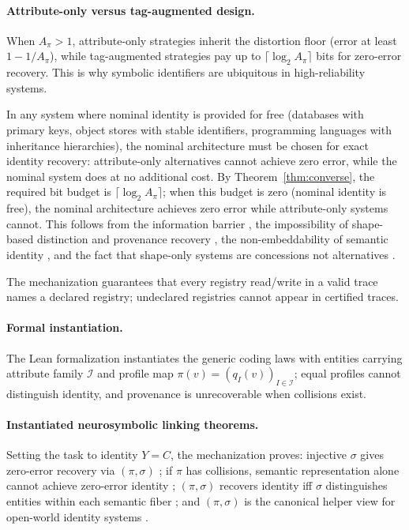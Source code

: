 \paragraph{Attribute-only versus tag-augmented design.}
When $A_\pi>1$, attribute-only strategies inherit the distortion floor (error at least $1-1/A_\pi$), while tag-augmented strategies pay up to $\lceil \log_2 A_\pi \rceil$ bits for zero-error recovery. This is why symbolic identifiers are ubiquitous in high-reliability systems.

\begin{corollary}\label{cor:pareto-domination}
In any system where nominal identity is provided for free (databases with primary keys, object stores with stable identifiers, programming languages with inheritance hierarchies), the nominal architecture must be chosen for exact identity recovery: attribute-only alternatives cannot achieve zero error, while the nominal system does at no additional cost. By Theorem~\ref*{thm:converse}, the required bit budget is $\lceil \log_2 A_\pi \rceil$; when this budget is zero (nominal identity is free), the nominal architecture achieves zero error while attribute-only systems cannot. This follows from the information barrier , the impossibility of shape-based distinction  and provenance recovery , the non-embeddability of semantic identity , and the fact that shape-only systems are concessions not alternatives .
\end{corollary}


The mechanization guarantees that every registry read/write in a valid trace names a declared registry; undeclared registries cannot appear in certified traces. 

\paragraph{Formal instantiation.}
The Lean formalization instantiates the generic coding laws with entities carrying attribute family $\mathcal I$ and profile map $\pi(v)=(q_I(v))_{I\in\mathcal I}$; equal profiles cannot distinguish identity, and provenance is unrecoverable when collisions exist. 

\paragraph{Instantiated neurosymbolic linking theorems.}
Setting the task to identity $Y=C$, the mechanization proves: injective $\sigma$ gives zero-error recovery via $(\pi,\sigma)$ ; if $\pi$ has collisions, semantic representation alone cannot achieve zero-error identity ; $(\pi,\sigma)$ recovers identity iff $\sigma$ distinguishes entities within each semantic fiber ; and $(\pi,\sigma)$ is the canonical helper view for open-world identity systems .

